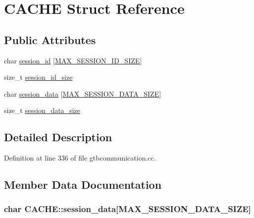 \hypertarget{structCACHE}{\section{C\-A\-C\-H\-E Struct Reference}
\label{structCACHE}
}
\subsection*{Public Attributes}
\begin{DoxyCompactItemize}
\item 
char \hyperlink{structCACHE_a546945d83f3c1401f06d1cfdf5107689}{session\-\_\-id} \mbox{[}\hyperlink{gtbcommunication_8cc_adce962b5553591d36b5e51bdc06ec2eb}{M\-A\-X\-\_\-\-S\-E\-S\-S\-I\-O\-N\-\_\-\-I\-D\-\_\-\-S\-I\-Z\-E}\mbox{]}
\item 
size\-\_\-t \hyperlink{structCACHE_ad06d74c3164389ccc45261443bafc460}{session\-\_\-id\-\_\-size}
\item 
char \hyperlink{structCACHE_a92a4c57e09f7d5e310256f044cf152a8}{session\-\_\-data} \mbox{[}\hyperlink{gtbcommunication_8cc_a235acd5aaa5caea1f0ec56b02e1ba2ea}{M\-A\-X\-\_\-\-S\-E\-S\-S\-I\-O\-N\-\_\-\-D\-A\-T\-A\-\_\-\-S\-I\-Z\-E}\mbox{]}
\item 
size\-\_\-t \hyperlink{structCACHE_ab8dfd4baa14b034eaedad34115ad06f5}{session\-\_\-data\-\_\-size}
\end{DoxyCompactItemize}


\subsection{Detailed Description}


Definition at line 336 of file gtbcommunication.\-cc.



\subsection{Member Data Documentation}
\hypertarget{structCACHE_a92a4c57e09f7d5e310256f044cf152a8}{
\subsubsection[{session\-\_\-data}]{\setlength{\rightskip}{0pt plus 5cm}char C\-A\-C\-H\-E\-::session\-\_\-data\mbox{[}{\bf M\-A\-X\-\_\-\-S\-E\-S\-S\-I\-O\-N\-\_\-\-D\-A\-T\-A\-\_\-\-S\-I\-Z\-E}\mbox{]}}}\label{structCACHE_a92a4c57e09f7d5e310256f044cf152a8}


